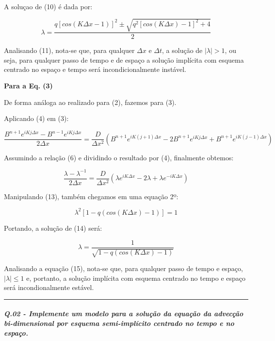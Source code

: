 \documentclass[11pt]{article}
\begin{document}
A soluçao de (10) é dada por:

\begin{equation}
    \lambda = \frac{q[cos(K\Delta{x} -1)]^2 \pm \sqrt{q^2[cos(K\Delta{x})-1]^2 + 4} }{2}
\end{equation}

Analisando (11), nota-se que, para qualquer \(\Delta{x}\) e
\(\Delta{t}\), a solução de \(|\lambda| > 1\), ou seja, para qualquer
passo de tempo e de espaço a solução implícita com esquema centrado no
espaço e tempo será incondicionalmente instável.

\textbf{Para a Eq. (3)}

De forma análoga ao realizado para (2), fazemos para (3).

Aplicando (4) em (3):

\begin{equation}
        \frac{B^{n+1}e^{iKj\Delta{x}} - B^{n-1}e^{iKj\Delta{x}} }{2\Delta{x}} = \frac{D}{\Delta{x^2}}(B^{n+1}e^{iK(j+1)\Delta{x}} - 2B^{n+1}e^{iKj\Delta{x}} + B^{n+1}e^{iK(j-1)\Delta{x}})
\end{equation}

Assumindo a relação (6) e dividindo o resultado por (4), finalmente
obtemos:

\begin{equation}
    \frac{\lambda - \lambda^{-1}}{2\Delta{x}} = \frac{D}{\Delta{x^2}}(\lambda e^{iK\Delta{x}} - 2\lambda + \lambda e^{-iK\Delta{x}})
\end{equation}

Manipulando (13), também chegamos em uma equação 2º:

\begin{equation}
    \lambda^{2}[1 - q(cos(K\Delta{x}) - 1)] = 1
\end{equation}

Portando, a solução de (14) será:

\begin{equation}
    \lambda = \frac{1}{\sqrt{1 - q(cos(K\Delta{x}) - 1)}}
\end{equation}

Analisando a equação (15), nota-se que, para qualquer passo de tempo e
espaço, \(|\lambda| \le 1\) e, portanto, a solução implícita com esquema
centrado no tempo e espaço será incondionalmente estável.

    \begin{center}\rule{0.5\linewidth}{\linethickness}\end{center}

    \subparagraph{Q.02 - Implemente um modelo para a solução da equação da
advecção bi-dimensional por esquema semi-implícito centrado no tempo e
no
espaço.}\label{q.02---implemente-um-modelo-para-a-soluuxe7uxe3o-da-equauxe7uxe3o-da-advecuxe7uxe3o-bi-dimensional-por-esquema-semi-impluxedcito-centrado-no-tempo-e-no-espauxe7o.}
\end{document}

